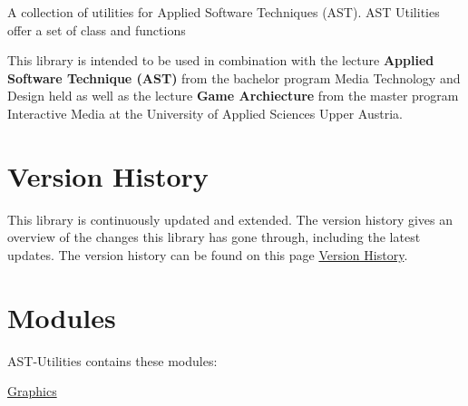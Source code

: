 A collection of utilities for Applied Software Techniques (A\+ST). A\+ST Utilities offer a set of class and functions

This library is intended to be used in combination with the lecture {\bfseries Applied Software Technique (A\+ST)} from the bachelor program Media Technology and Design held as well as the lecture {\bfseries Game Archiecture} from the master program Interactive Media at the University of Applied Sciences Upper Austria.\hypertarget{index_hist_sect}{}\section{Version History}\label{index_hist_sect}
This library is continuously updated and extended. The version history gives an overview of the changes this library has gone through, including the latest updates. The version history can be found on this page \hyperlink{CHANGES}{Version History}.\hypertarget{index_io_sect}{}\section{Modules}\label{index_io_sect}
A\+S\+T-\/\+Utilities contains these modules\+:


\begin{DoxyItemize}
\item \hyperlink{group__gfx__group}{Graphics} 
\end{DoxyItemize}